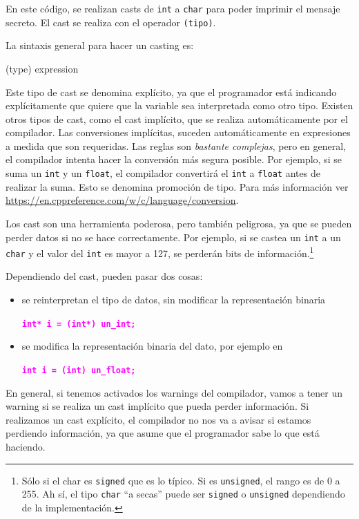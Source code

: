 \documentclass[]{scrartcl}
\newcommand{\hl}[1]{\textcolor{magenta}{\textbf{\texttt{#1}}}}
\begin{document}
En este código, se realizan casts de \texttt{int} a \texttt{char} para poder imprimir el mensaje secreto. El cast se realiza con el operador \texttt{(tipo)}. 

La sintaxis general para hacer un casting es:

\begin{bashbox}[]
  (type) expression
\end{bashbox}

Este tipo de cast se denomina explícito, ya que el programador está indicando explícitamente que quiere que la variable sea interpretada como otro tipo. Existen otros tipos de cast, como el cast implícito, que se realiza automáticamente por el compilador. Las conversiones implícitas, suceden automáticamente en expresiones a medida que son requeridas. Las reglas son \textit{bastante complejas}, pero en general, el compilador intenta hacer la conversión más segura posible. Por ejemplo, si se suma un \texttt{int} y un \texttt{float}, el compilador convertirá el \texttt{int} a \texttt{float} antes de realizar la suma. Esto se denomina promoción de tipo. Para más información ver \url{https://en.cppreference.com/w/c/language/conversion}.

Los cast son una herramienta poderosa, pero también peligrosa, ya que se pueden perder datos si no se hace correctamente. Por ejemplo, si se castea un \texttt{int} a un \texttt{char} y el valor del \texttt{int} es mayor a 127, se perderán bits de información.\footnote{Sólo si el char es \texttt{signed} que es lo típico. Si es \texttt{unsigned}, el rango es de 0 a 255. Ah sí, el tipo \texttt{char} ``a secas'' puede ser \texttt{signed} o \texttt{unsigned} dependiendo de la implementación.}

Dependiendo del cast, pueden pasar dos cosas: 
\begin{itemize}
  \item se reinterpretan el tipo de datos, sin modificar la representación binaria 
  
  \hl{int* i = (int*) un\_int;}
  
  \item se modifica la representación binaria del dato, por ejemplo en 
  
  \hl{int i = (int) un\_float;}
\end{itemize}

En general, si tenemos activados los warnings del compilador, vamos a tener un warning si se realiza un cast implícito que pueda perder información. Si realizamos un cast explícito, el compilador no nos va a avisar si estamos perdiendo información, ya que asume que el programador sabe lo que está haciendo.
\end{document}
